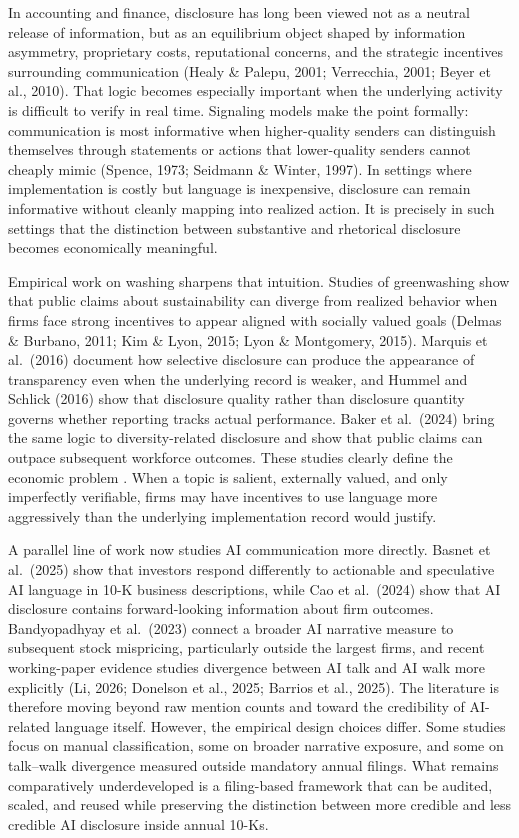 In accounting and finance, disclosure has long been viewed not as a neutral release of information, but as an equilibrium object shaped by information asymmetry, proprietary costs, reputational concerns, and the strategic incentives surrounding communication (Healy \& Palepu, 2001; Verrecchia, 2001; Beyer et al., 2010). That logic becomes especially important when the underlying activity is difficult to verify in real time. Signaling models make the point formally: communication is most informative when higher-quality senders can distinguish themselves through statements or actions that lower-quality senders cannot cheaply mimic (Spence, 1973; Seidmann \& Winter, 1997). In settings where implementation is costly but language is inexpensive, disclosure can remain informative without cleanly mapping into realized action. It is precisely in such settings that the distinction between substantive and rhetorical disclosure becomes economically meaningful.

Empirical work on washing sharpens that intuition. Studies of greenwashing show that public claims about sustainability can diverge from realized behavior when firms face strong incentives to appear aligned with socially valued goals (Delmas \& Burbano, 2011; Kim \& Lyon, 2015; Lyon \& Montgomery, 2015). Marquis et al.~(2016) document how selective disclosure can produce the appearance of transparency even when the underlying record is weaker, and Hummel and Schlick (2016) show that disclosure quality rather than disclosure quantity governs whether reporting tracks actual performance. Baker et al.~(2024) bring the same logic to diversity-related disclosure and show that public claims can outpace subsequent workforce outcomes. These studies clearly define the economic problem . When a topic is salient, externally valued, and only imperfectly verifiable, firms may have incentives to use language more aggressively than the underlying implementation record would justify.

A parallel line of work now studies AI communication more directly. Basnet et al.~(2025) show that investors respond differently to actionable and speculative AI language in 10-K business descriptions, while Cao et al.~(2024) show that AI disclosure contains forward-looking information about firm outcomes. Bandyopadhyay et al.~(2023) connect a broader AI narrative measure to subsequent stock mispricing, particularly outside the largest firms, and recent working-paper evidence studies divergence between AI talk and AI walk more explicitly (Li, 2026; Donelson et al., 2025; Barrios et al., 2025). The literature is therefore moving beyond raw mention counts and toward the credibility of AI-related language itself. However, the empirical design choices differ. Some studies focus on manual classification, some on broader narrative exposure, and some on talk--walk divergence measured outside mandatory annual filings. What remains comparatively underdeveloped is a filing-based framework that can be audited, scaled, and reused while preserving the distinction between more credible and less credible AI disclosure inside annual 10-Ks.

